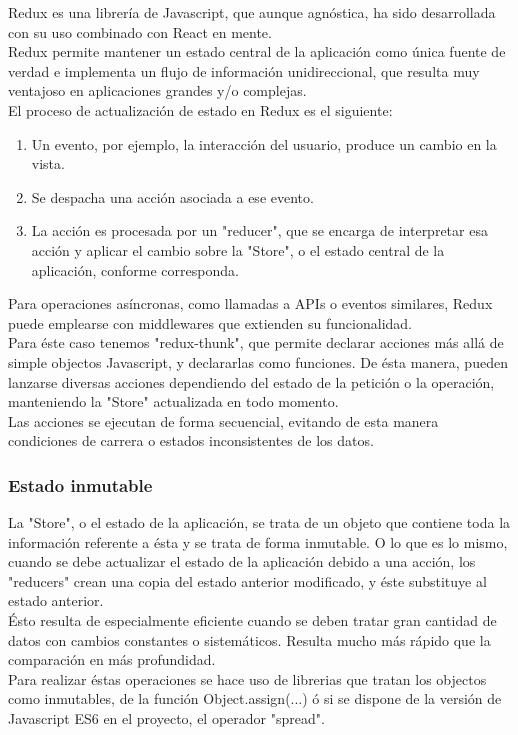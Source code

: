 Redux es una librería de Javascript, que aunque agnóstica, ha sido desarrollada con su uso combinado con React en mente. \\ Redux permite mantener un estado central de la aplicación como única fuente de verdad e implementa un flujo de información unidireccional, que resulta muy ventajoso en aplicaciones grandes y/o complejas. \\

El proceso de actualización de estado en Redux es el siguiente: 

\begin{enumerate}  
	\item  Un evento, por ejemplo, la interacción del usuario, produce un cambio en la vista.
	\item Se despacha una acción asociada a ese evento. 
	\item La acción es procesada por un "reducer", que se encarga de interpretar esa acción y aplicar el cambio sobre la "Store", o el estado central de la aplicación, conforme corresponda.
\end{enumerate}

Para operaciones asíncronas, como llamadas a APIs o eventos similares, Redux puede emplearse con middlewares que extienden su funcionalidad. \\ 
Para éste caso tenemos "redux-thunk", que permite declarar acciones más allá de simple objectos Javascript, y declararlas como funciones. De ésta manera, pueden lanzarse diversas acciones dependiendo del estado de la petición o la operación, manteniendo la "Store" actualizada en todo momento. \\

Las acciones se ejecutan de forma secuencial, evitando de esta manera condiciones de carrera o estados inconsistentes de los datos. \\

\subsubsection {Estado inmutable}

La "Store", o el estado de la aplicación, se trata de un objeto que contiene toda la información referente a ésta y se trata de forma inmutable. O lo que es lo mismo, cuando se debe actualizar el estado de la aplicación debido a una acción, los "reducers" crean una copia del estado anterior modificado, y éste substituye al estado anterior. \\

Ésto resulta de especialmente eficiente cuando se deben tratar gran cantidad de datos con cambios constantes o sistemáticos. Resulta mucho más rápido que la comparación en más profundidad. \\

Para realizar éstas operaciones se hace uso de librerias que tratan los objectos como inmutables, de la función Object.assign(...) ó si se dispone de la versión de Javascript ES6 en el proyecto, el operador "spread". \\

